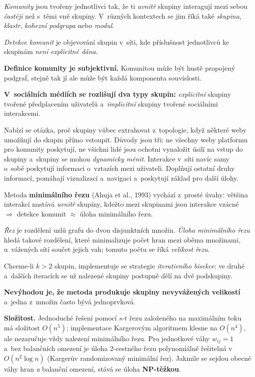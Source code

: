 \documentclass[11pt,a4paper]{article}
\theoremstyle{definition}
\begin{document}
\begin{defbox}
\emph{Komunity} jsou tvořeny jednotlivci tak, že ti \emph{uvnitř} skupiny interagují mezi sebou
\emph{častěji} než s~těmi vně skupiny. V~různých kontextech se jim říká také \emph{skupina},
\emph{klastr}, \emph{kohezní podgrupa} nebo \emph{modul}.

\emph{Detekce komunit} je objevování skupin v~síti, kde příslušnost jednotlivců ke skupinám
\emph{není explicitně dána}.

\textbf{Definice komunity je subjektivní.} Komunitou může být hustě propojený podgraf, stejně
tak jí ale může být každá komponenta souvislosti.

\textbf{V~sociálních médiích se rozlišují dva typy skupin:} \emph{explicitní} skupiny tvořené
předplacením uživatelů a~\emph{implicitní} skupiny tvořené sociálními interakcemi.

Nabízí se otázka, proč skupiny vůbec extrahovat z~topologie, když některé weby umožňují do
skupin přímo vstoupit. Důvody jsou tři: ne všechny weby platformu pro komunity poskytují, ne
všichni lidé jsou ochotni vynaložit úsilí na vstup do skupiny a~skupiny se mohou \emph{dynamicky
měnit}. Interakce v~síti navíc samy o~sobě poskytují informaci o~vztazích mezi uživateli.
Doplňují ostatní druhy informací, pomáhají vizualizaci a~navigaci a~poskytují základ pro další
úlohy.
\end{defbox}

\begin{defbox}
Metoda \textbf{minimálního řezu} (Ahuja et al., 1993) vychází z~prosté úvahy: většina interakcí
nastává \emph{uvnitř} skupiny, kdežto mezi skupinami jsou interakce vzácné $\Rightarrow$
detekce komunit $\approx$ úloha minimálního řezu.

\emph{Řez} je rozdělení uzlů grafu do dvou disjunktních množin. \emph{Úloha minimálního
řezu} hledá takové rozdělení, které minimalizuje počet hran mezi oběma množinami, u~vážených
sítí součet jejich vah; tomuto počtu se říká \emph{velikost řezu}.

Chceme-li $k>2$ skupin, implementuje se strategie \emph{iterativního bisekce}: ve druhé
a~dalších iteracích se už nalezené skupiny postupně dělí na dvě podskupiny.

\textbf{Nevýhodou je, že metoda produkuje skupiny nevyvážených velikostí} a~jedna z~množin
často bývá jednoprvková.

\textbf{Složitost.} Jednoduché řešení pomocí $s$-$t$ řezu založeného na maximálním toku má
složitost $O(n^5)$; implementace Kargerovým algoritmem klesne na $O(n^4)$, ale nezaručuje vždy
nalezení minimálního řezu. Pro jednotkové váhy $w_{ij}=1$ a~bez balančních omezení je úloha
2-cestného řezu polynomiálně řešitelná v~$O(n^2\log n)$ (Kargerův randomizovaný minimální řez).
Jakmile se sejdou obecné váhy hran \emph{a} balanční omezení, stává se úloha \textbf{NP-těžkou}.
\end{defbox}
\end{document}
